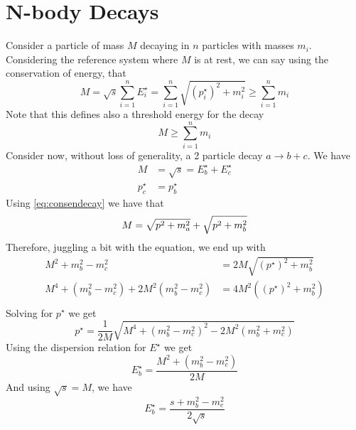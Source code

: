 \documentclass[../admech.tex]{subfiles}
\begin{document}
\section{N-body Decays}
Consider a particle of mass $M$ decaying in $n$ particles with masses $m_i$. Considering the reference system where $M$ is at rest, we can say using the conservation of energy, that
\begin{equation}
	M=\sqrt{s}\sum_{i=1}^nE_i^\star=\sum_{i=1}^n\sqrt{(p_i^\star)^2+m^2_i}\ge\sum_{i=1}^nm_i
	\label{eq:consendecay}
\end{equation}
Note that this defines also a threshold energy for the decay
\begin{equation*}
	M\ge\sum_{i=1}^nm_i
\end{equation*}
Consider now, without loss of generality, a 2 particle decay $a\to b+c$. We have
\begin{equation}
	\begin{aligned}
		M&=\sqrt{s}=E_b^\star+E_c^\star\\
		p_c^\star&=p_b^\star
	\end{aligned}
	\label{eq:rootsmomdec}
\end{equation}
Using \eqref{eq:consendecay} we have that
\begin{equation*}
	M=\sqrt{p^2+m_a^2}+\sqrt{p^2+m_b^2}\\
\end{equation*}
Therefore, juggling a bit with the equation, we end up with
\begin{equation*}
	\begin{aligned}
		M^2+m_b^2-m_c^2&=2M\sqrt{(p^\star)^2+m_b^2}\\
		M^4+(m_b^2-m_c^2)+2M^2(m_b^2-m_c^2)&=4M^2\left( (p^\star)^2+m_b^2 \right)\\
	\end{aligned}
\end{equation*}
Solving for $p^\star$ we get
\begin{equation}
	p^\star=\frac{1}{2M}\sqrt{M^4+(m_b^2-m_c^2)^2-2M^2(m_b^2+m_c^2)}
	\label{eq:pstardecay}
\end{equation}
Using the dispersion relation for $E^\star$ we get
\begin{equation}
	E_b^\star=\frac{M^2+(m_b^2-m_c^2)}{2M}
	\label{eq:disreldec}
\end{equation}
And using $\sqrt{s}=M$, we have
\begin{equation}
	E_b^\star=\frac{s+m_b^2-m_c^2}{2\sqrt{s}}
	\label{eq:disrel2decroots}
\end{equation}
\end{document}
